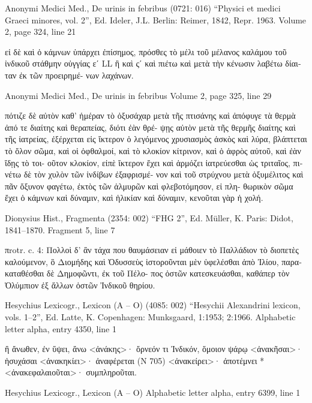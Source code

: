\documentclass[12pt,letterpaper,twoside,final]{memoir}
\begin{document}
\begin{greek}
Anonymi Medici Med., De urinis in febribus (0721: 016)
“Physici et medici Graeci minores, vol. 2”, Ed. Ideler, J.L.
Berlin: Reimer, 1842, Repr. 1963.
Volume 2, page 324, line 21

                                             εἰ δὲ καὶ ὁ κάμνων 
ὑπάρχει ἐπίσημος, πρόσθες τὸ μέλι τοῦ μέλανος καλάμου 
τοῦ ἰνδικοῦ στάθμην οὐγγίας εʹ LL ἢ καὶ ςʹ καὶ πιέτω 
καὶ μετὰ τὴν κένωσιν λαβέτω δίαιταν ἐκ τῶν προειρημέ-
νων λαχάνων. 



Anonymi Medici Med., De urinis in febribus 
Volume 2, page 325, line 29

                                               πότιζε δὲ αὐτὸν 
καθ' ἡμέραν τὸ ὀξυσάχαρ μετὰ τῆς πτισάνης καὶ ἀπόφυγε 
τὰ θερμὰ ἀπό τε διαίτης καὶ θεραπείας, διότι ἐὰν θρέ-
ψῃς αὐτὸν μετὰ τῆς θερμῆς διαίτης καὶ τῆς ἰατρείας, 
ἐξέρχεται εἰς ἴκτερον ὁ λεγόμενος χρυσιασμὸς ἀσκὸς καὶ 
λύρα, βλάπτεται τὸ ὅλον σῶμα, καὶ οἱ ὀφθαλμοί, καὶ τὸ 
κλοκίον κίτρινον, καὶ ὁ ἀφρὸς αὐτοῦ, καὶ ἐὰν ἴδῃς τὸ τοι-
οῦτον κλοκίον, εἰπὲ ἴκτερον ἔχει καὶ ἁρμόζει ἰατρεύεσθαι 
ὡς τριταῖος, πινέτω δὲ τὸν χυλὸν τῶν ἰνδίβων ἐξαφρισμέ-
νον καὶ τοῦ στρύχνου μετὰ ὀξυμέλιτος καὶ πᾶν ὄξυνον 
φαγέτω, ἐκτὸς τῶν ἁλμυρῶν καὶ φλεβοτόμησον, εἰ πλη-
θωρικὸν σῶμα ἔχει ὁ κάμνων καὶ δύναμιν, καὶ ἡλικίαν 
καὶ δύναμιν, κενοῦται γὰρ ἡ χολή. 



Dionysius Hist., Fragmenta (2354: 002)
“FHG 2”, Ed. Müller, K.
Paris: Didot, 1841–1870.
Fragment 5, line 7

              πrotr. c. 4: 
Πολλοὶ δ' ἂν τάχα που θαυμάσειαν   
εἰ μάθοιεν τὸ Παλλάδιον τὸ διοπετὲς καλούμενον, ὃ 
Διομήδης καὶ Ὀδυσσεὺς ἱστοροῦνται μὲν ὑφελέσθαι ἀπὸ 
Ἰλίου, παρακαταθέσθαι δὲ Δημοφῶντι, ἐκ τοῦ Πέλο-
πος ὀστῶν κατεσκευάσθαι, καθάπερ τὸν Ὀλύμπιον ἐξ 
ἄλλων ὀστῶν Ἰνδικοῦ θηρίου. 



Hesychius Lexicogr., Lexicon (Α – Ο) (4085: 002)
“Hesychii Alexandrini lexicon, vols. 1–2”, Ed. Latte, K.
Copenhagen: Munksgaard, 1:1953; 2:1966.
Alphabetic letter alpha, entry 4350, line 1

                                   ἢ ἄνωθεν, ἐν ὕψει, ἄνω 
<ἀνάκης>· ὄρνεόν τι Ἰνδικόν, ὅμοιον ψάρῳ 
<ἀνακῆσαι>· ἡσυχάσαι 
<ἀνακηκίει>· ἀναφέρεται (Ν 705) 
<ἀνακείρει>· ἀποτέμνει 
*<ἀνακεφαλαιοῦται>· συμπληροῦται. 



Hesychius Lexicogr., Lexicon (Α – Ο) 
Alphabetic letter alpha, entry 6399, line 1


\end{greek}
\end{document}
